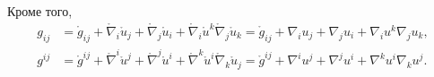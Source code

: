 Кроме того, 
\begin{align*}
  g_{ij} &= \mathring{g}_{ij} + \mathring{\nabla}_i \mathring{u}_j +
  \mathring{\nabla}_j\mathring{u}_i + \mathring{\nabla}_i\mathring{u}^k
  \mathring{\nabla}_j \mathring{u}_k = \mathring{g}_{ij} + {\nabla}_i {u}_j +
  {\nabla}_j{u}_i + {\nabla}_i{u}^k
  {\nabla}_j {u}_k,\\
  g^{ij} &= \mathring{g}^{ij}+\mathring{\nabla}^i \mathring{u}^j +
  \mathring{\nabla}^j\mathring{u}^i + \mathring{\nabla}^k\mathring{u}^i
  \mathring{\nabla}_k \mathring{u}_j = \mathring{g}^{ij} + {\nabla}^i {u}^j +
  {\nabla}^j{u}^i + {\nabla}^k{u}^i
  {\nabla}_k {u}^j.
\end{align*}


